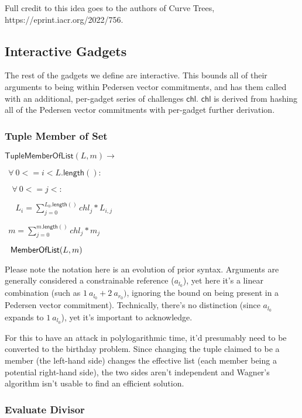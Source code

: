 \documentclass[]{article}
\begin{document}
Full credit to this idea goes to the authors of Curve Trees, https://eprint.iacr.org/2022/756.

\newpage

\subsection{Interactive Gadgets}

\newcommand{\chl}{\mathsf{chl}}

The rest of the gadgets we define are interactive. This bounds all of their arguments to being within Pedersen vector commitments, and has them called with an additional, per-gadget series of challenges $\chl$. $\chl$ is derived from hashing all of the Pedersen vector commitments with per-gadget further derivation.

\subsubsection{Tuple Member of Set}

\newcommand{\tuplememberlist}{\mathsf{TupleMemberOfList}}

$\tuplememberlist(L, m) \rightarrow$

$~~\forall ~0 <= i < L\mathsf{.length}():$

$~~~~\forall ~0 <= j < :$

$~~~~~~L_i = \sum^{L_0\mathsf{.length}()}_{j=0} chl_j * L_{i,j}$

$~~m = \sum^{m\mathsf{.length}()}_{j=0} chl_j * m_j$

$~~\mathsf{MemberOfList}(L, m)$

Please note the notation here is an evolution of prior syntax. Arguments are generally considered a constrainable reference ($a_{l_0}$), yet here it's a linear combination (such as $1 ~a_{l_0} + 2 ~a_{r_0})$, ignoring the bound on being present in a Pedersen vector commitment). Technically, there's no distinction (since $a_{l_0}$ expands to $1 ~a_{l_0}$), yet it's important to acknowledge.

For this to have an attack in polylogarithmic time, it'd presumably need to be converted to the birthday problem. Since changing the tuple claimed to be a member (the left-hand side) changes the effective list (each member being a potential right-hand side), the two sides aren't independent and Wagner's algorithm isn't usable to find an efficient solution.

\subsubsection{Evaluate Divisor}
\end{document}
